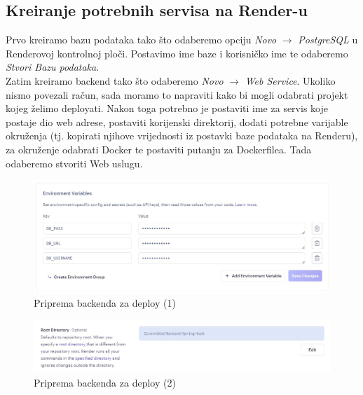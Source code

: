 			
			
			\subsection{Kreiranje potrebnih servisa na Render-u}
			
			Prvo kreiramo bazu podataka tako što odaberemo opciju \textit{Novo} $\xrightarrow{}$ \textit{PostgreSQL} u Renderovoj kontrolnoj ploči. Postavimo ime baze i korisničko ime te odaberemo \textit{Stvori Bazu podataka}. \\
			Zatim kreiramo backend tako što odaberemo \textit{Novo} $\xrightarrow{}$ \textit{Web Service}. Ukoliko nismo povezali račun, sada moramo to napraviti kako bi mogli odabrati projekt kojeg želimo deployati. Nakon toga potrebno je postaviti ime za servis koje postaje dio web adrese, postaviti korijenski direktorij, dodati potrebne varijable okruženja (tj. kopirati njihove vrijednosti iz postavki baze podataka na Renderu), za okruženje odabrati Docker te postaviti putanju za Dockerfilea. Tada odaberemo stvoriti Web uslugu. 
			
			
			\begin{figure}[H]
				\includegraphics[width=\textwidth]{slike/Priprema_backenda.jpg} 
				\centering
				\vspace{-0.2cm}
				\caption{Priprema backenda za deploy (1)}
				\label{back}
			\end{figure}
			
			
			\begin{figure}[H]
				\includegraphics[width=\textwidth]{slike/Priprema_backenda2.jpg} 
				\centering
				\vspace{-0.2cm}
				\caption{Priprema backenda za deploy (2)}
				\label{back2}
			\end{figure}
			
